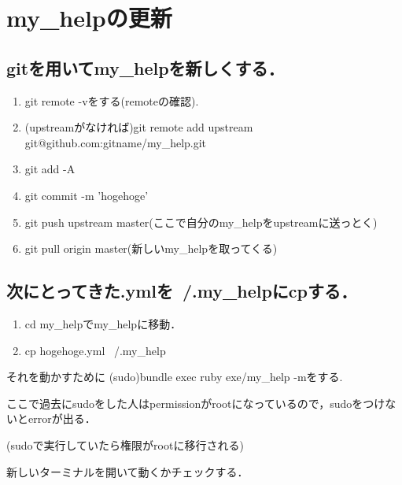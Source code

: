 \section{my\_helpの更新}
\subsection{gitを用いてmy\_helpを新しくする．}\begin{enumerate}
\item git remote -vをする(remoteの確認).
\item (upstreamがなければ)git remote add upstream git@github.com:gitname/my\_help.git
\item git add -A
\item git commit -m 'hogehoge'
\item git push upstream master(ここで自分のmy\_helpをupstreamに送っとく)
\item git pull origin master(新しいmy\_helpを取ってくる)
\end{enumerate}
\subsection{次にとってきた.ymlを~/.my\_helpにcpする．}\begin{enumerate}
\item cd my\_helpでmy\_helpに移動．
\item cp hogehoge.yml ~/.my\_help
\end{enumerate}
それを動かすために
(sudo)bundle exec ruby exe/my\_help -mをする.

ここで過去にsudoをした人はpermissionがrootになっているので，sudoをつけないとerrorが出る．

(sudoで実行していたら権限がrootに移行される)

新しいターミナルを開いて動くかチェックする．

